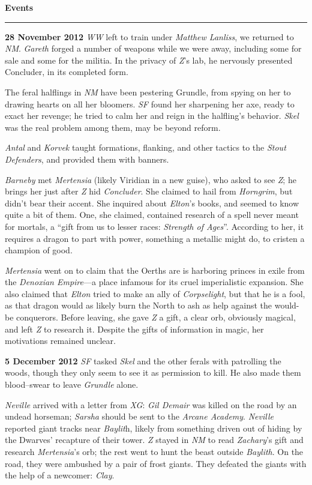 \documentclass[letterpaper]{article}
\newcommand{\e}[1]{\emph{#1}}
\newcommand{\B}[1]{\textbf{#1}}
\newenvironment{notesection}[1]
{ {\huge \B{#1}}\hrule\vspace{0.5em}\begingroup\fontsize{9pt}{12pt}\selectfont}
{\endgroup}
\begin{document}
\begin{notesection}{Events}
\B{28 November 2012} \e{WW} left to train under \e{Matthew Lanliss}, we returned to \e{NM}. \e{Gareth} forged a number of weapons while we were away, including some for sale and some for the militia. In the privacy of \e{Z}'s lab, he nervously presented Concluder, in its completed form.

The feral halflings in \e{NM} have been pestering Grundle, from spying on her to drawing hearts on all her bloomers. \e{SF} found her sharpening her axe, ready to exact her revenge; he tried to calm her and reign in the halfling's behavior. \e{Skel} was the real problem among them, may be beyond reform.

\e{Antal} and \e{Korvek} taught formations, flanking, and other tactics to the \e{Stout Defenders}, and provided them with banners.

\e{Barneby} met \e{Mertensia} (likely Viridian in a new guise), who asked to see \e{Z}; he brings her just after \e{Z} hid \e{Concluder}. She claimed to hail from \e{Horngrim}, but didn't bear their accent. She inquired about \e{Elton}'s books, and seemed to know quite a bit of them. One, she claimed, contained research of a spell never meant for mortals, a ``gift from us to lesser races: \e{Strength of Ages}''. According to her, it requires a dragon to part with power, something a metallic might do, to cristen a champion of good.

\e{Mertensia} went on to claim that the Oerths are is harboring princes in exile from the \e{Denoxian Empire}---a place infamous for its cruel imperialistic expansion.  She also claimed that \e{Elton} tried to make an ally of \e{Corpselight}, but that he is a fool, as that dragon would as likely burn the North to ash as help against the would-be conquerors. Before leaving, she gave \e{Z} a gift, a clear orb, obviously magical, and left \e{Z} to research it. Despite the gifts of information in magic, her motivations remained unclear.

\B{5 December 2012} \e{SF} tasked \e{Skel} and the other ferals with patrolling the woods, though they only seem to see it as permission to kill. He also made them blood--swear to leave \e{Grundle} alone.

\e{Neville} arrived with a letter from \e{XG}: \e{Gil Demair} was killed on the road by an undead horseman; \e{Sarsha} should be sent to the \e{Arcane Academy}. \e{Neville} reported giant tracks near \e{Baylit}h, likely from something driven out of hiding by the Dwarves' recapture of their tower.  \e{Z} stayed in \e{NM} to read \e{Zachary}'s gift and research \e{Mertensia}'s orb; the rest went to hunt the beast outside \e{Baylith}. On the road, they were ambushed by a pair of frost giants. They defeated the giants with the help of a newcomer: \e{Clay}.


\end{notesection}
\end{document}
